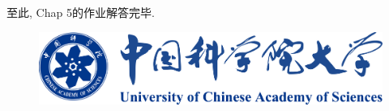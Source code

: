 \documentclass{article}
\begin{document}
\vspace{2cm}

至此, Chap 5的作业解答完毕.

\vspace{2cm}

\begin{figure}[H]  %
	\centering
	\includegraphics[width=0.7\linewidth]{images/title/ucas_logo 1.pdf}
	\label{fig:ucas-logo}
\end{figure}



\end{document}
